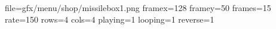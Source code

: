 file=gfx/menu/shop/missilebox1.png
framex=128
framey=50
frames=15
rate=150
rows=4
cols=4
playing=1
looping=1
reverse=1
